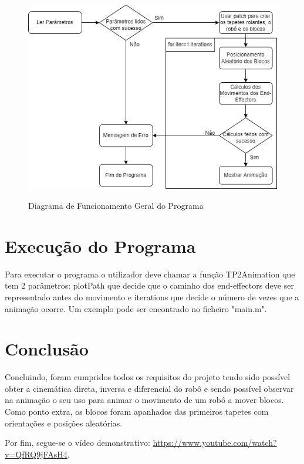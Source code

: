 \documentclass{report}
\begin{document}
\begin{figure}[H]
   \centering
   \includegraphics[width=4.5in]{diagram.png}
   \label{fig:figuras}
   \caption{Diagrama de Funcionamento Geral do Programa}
\end{figure}

\section{Execução do Programa}

Para executar o programa o utilizador deve chamar a função TP2Animation que tem 2 parâmetros: plotPath que decide que o caminho dos end-effectors deve ser representado antes do movimento e iterations que decide o número de vezes que a animação ocorre. Um exemplo pode ser encontrado no ficheiro "main.m".

\section{Conclusão}

\quad Concluindo, foram cumpridos todos os requisitos do projeto tendo sido possível obter a cinemática direta, inversa e diferencial do robô e sendo possível observar na animação o seu uso para animar o movimento de um robô a mover blocos. Como ponto extra, os blocos foram apanhados das primeiros tapetes com orientações e posições aleatórias.

Por fim, segue-se o vídeo demonstrativo: \url{https://www.youtube.com/watch?v=QfRQ9jFAsH4}.
\end{document}
